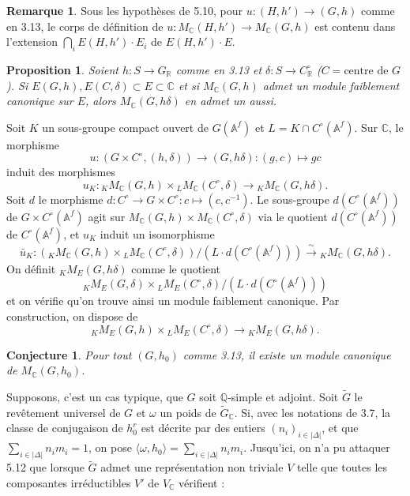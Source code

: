 \documentclass[11pt]{amsart}
\theoremstyle{plain}
\newtheorem{proposition}[theorem]{Proposition}
\newtheorem{conjecture}[theorem]{Conjecture}
\theoremstyle{definition}
\newtheorem{remark}[theorem]{Remarque}
\newcommand{\QQ}{\mathbb{Q}}
\newcommand{\RR}{\mathbb{R}}
\newcommand{\CC}{\mathbb{C}}
\newcommand{\AAf}{\mathbb{A}^f}
\newcommand{\MC}{M_{\mathbb{C}}}
\begin{document}
\begin{remark}
Sous les hypoth\`eses de 5.10, pour $u : (H,h') \to (G,h)$ comme en 3.13, le corps de d\'efinition de $u : \MC(H,h') \to \MC(G,h)$ est contenu dans l'extension $\bigcap_i E(H,h') \cdot E_i$ de $E(H,h') \cdot E$.
\end{remark}

\begin{proposition}
Soient $h : S \to G_{\RR}$ comme en 3.13 et $\delta : S \to C^\circ_{\RR}$ ($C = \text{centre de } G$). Si $E(G,h), E(C,\delta) \subset E \subset \CC$ et si $\MC(G,h)$ admet un module faiblement canonique sur $E$, alors $\MC(G, h\delta)$ en admet un aussi.
\end{proposition}

Soit $K$ un sous-groupe compact ouvert de $G(\AAf)$ et $L = K \cap C^\circ(\AAf)$. Sur $\CC$, le morphisme
\[
u : (G \times C^\circ, (h, \delta)) \longrightarrow (G, h\delta) : (g,c) \longmapsto gc
\]
induit des morphismes
\[
u_K : {}_K \MC(G,h) \times {}_L \MC(C^\circ, \delta) \longrightarrow {}_K \MC(G, h\delta).
\]
Soit $d$ le morphisme $d : C^\circ \to G \times C^\circ : c \mapsto (c, c^{-1})$. Le sous-groupe $d(C^\circ(\AAf))$ de $G \times C^\circ(\AAf)$ agit sur $\MC(G,h) \times \MC(C^\circ, \delta)$ via le quotient $d(C^\circ(\AAf))$ de $C^\circ(\AAf)$, et $u_K$ induit un isomorphisme
\[
\bar{u}_K : ({}_K \MC(G,h) \times {}_L \MC(C^\circ, \delta))/(L \cdot d(C^\circ(\AAf))) \xrightarrow{\;\sim\;} {}_K \MC(G, h\delta).
\]
On d\'efinit ${}_K M_E(G, h\delta)$ comme le quotient
\[
{}_K M_E(G,\delta) \times {}_L M_E(C^\circ, \delta)/(L \cdot d(C^\circ(\AAf)))
\]
et on v\'erifie qu'on trouve ainsi un module faiblement canonique. Par construction, on dispose de
\[
{}_K M_E(G,h) \times {}_L M_E(C^\circ, \delta) \longrightarrow {}_K M_E(G, h\delta).
\]

\begin{conjecture}
Pour tout $(G, h_0)$ comme 3.13, il existe un module canonique de $\MC(G,h_0)$.
\end{conjecture}

Supposons, c'est un cas typique, que $G$ soit $\QQ$-simple et adjoint. Soit $\tilde{G}$ le rev\^etement universel de $G$ et $\omega$ un poids de $\tilde{G}_{\CC}$. Si, avec les notations de 3.7, la classe de conjugaison de $h_0^r$ est d\'ecrite par des entiers $(n_i)_{i \in |\Delta|}$, et que $\sum_{i \in |\Delta|} n_i m_i = 1$, on pose $\langle \omega, h_0 \rangle = \sum_{i \in |\Delta|} n_i m_i$. Jusqu'ici, on n'a pu attaquer 5.12 que lorsque $\tilde{G}$ admet une repr\'esentation non triviale $V$ telle que toutes les composantes irr\'eductibles $V'$ de $V_{\CC}$ v\'erifient :
\end{document}
